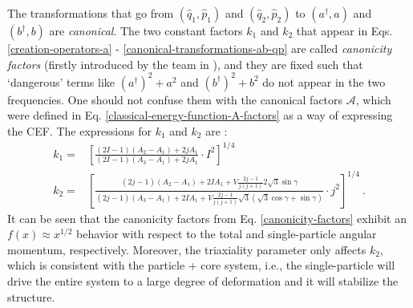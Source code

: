 The transformations that go from $(\hat{q}_1,\hat{p}_1)$ and $(\hat{q}_2,\hat{p}_2)$ to $(a^\dagger, a)$ and $(b^\dagger, b)$ are \emph{canonical}. The two constant factors $k_1$ and $k_2$ that appear in Eqs. \ref{creation-operators-a} - \ref{canonical-transformations-ab-qp} are called \emph{canonicity factors} (firstly introduced by the team in \cite{raduta2017semiclassical}), and they are fixed such that `dangerous' terms like $(a^\dagger)^2+a^2$ and $(b^\dagger)^2+b^2$ do not appear in the two frequencies. One should not confuse them with the canonical factors $\mathcal{A}$, which were defined in Eq. \ref{classical-energy-function-A-factors} as a way of expressing the CEF. The expressions for $k_1$ and $k_2$ are \cite{raduta2020approach}:
\begin{align}
    k_1=&\left[\frac{(2I-1)(A_2-A_1)+2jA_1}{(2I-1)(A_3-A_1)+2jA_1}\cdot I^2\right]^{1/4}\, \nonumber\\
    k_2=&\left[\frac{(2j-1)(A_2-A_1)+2IA_1+V\frac{2j-1}{j(j+1)}2\sqrt{3}\sin\gamma}{(2j-1)(A_3-A_1)+2IA_1+V\frac{2j-1}{j(j+1)}\sqrt{3}\left(\sqrt{3}\cos\gamma+\sin\gamma\right)}\cdot j^2\right]^{1/4}\ .
    \label{canonicity-factors}
\end{align}
It can be seen that the canonicity factors from Eq. \ref{canonicity-factors} exhibit an $f(x)\approx x^{1/2}$ behavior with respect to the total and single-particle angular momentum, respectively. Moreover, the triaxiality parameter only affects $k_2$, which is consistent with the particle + core system, i.e., the single-particle will drive the entire system to a large degree of deformation and it will stabilize the structure.

